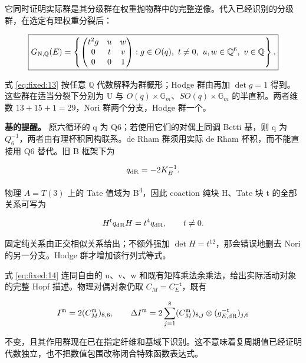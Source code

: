\documentclass[11pt,a4paper,oneside]{ctexart}
\theoremstyle{cnplain}
\theoremstyle{definition}
\theoremstyle{remark}
\numberwithin{equation}{section}
\begin{document}
它同时证明实际群是其分级群在权重抛物群中的完整逆像。代入已经识别的分级群，在选定有理权重分裂后：

\begin{equation}
\boxed{
 G_{\rm N,\mathbb Q}(E)=
 \left\{\begin{pmatrix}t^2g&u&w\\0&t&v\\0&0&1\end{pmatrix}:
     g\in O(q),\ t\ne0,\ u,w\in\mathbb Q^6,\ v\in\mathbb Q\right\}.
 }                                                               \label{eq:fixed:13}
\end{equation}

式 \eqref{eq:fixed:13} 按任意 \(\mathbb Q\) 代数解释为群概形；Hodge 群由再加 \(\det g=1\) 得到。这些群在适当分裂下分别为 U 与 \(O(q)\times\mathbb G_m\)、\(SO(q)\times\mathbb G_m\) 的半直积。两者维数 \(13+15+1=29\)，Nori 群两个分支，Hodge 群一个。

\textbf{基的提醒。} 原六循环的 q 为 Q6；若使用它们的对偶上同调 Betti 基，则 q 为 \(Q_6^{-1}\)，两者由有理杯积同构联系。de Rham 群须用实际 de Rham 杯积，而不能直接用 Q6 替代。旧 B 框架下为

\begin{equation}
q_{\rm dR}=-2K_B^{-1}.
\end{equation}

物理 \(A=T(3)\) 上的 Tate 值域为 B\textsuperscript{4}，因此 coaction 纯块 H、Tate 块 t 的全部关系可写为

\begin{equation}
H^{\mathsf t}q_{\rm dR}H=t^4q_{\rm dR},
                  \qquad t\ne0.                                \label{eq:fixed:14}
\end{equation}

固定纯关系由正交相似关系给出；不额外强加 \(\det H=t^{12}\)，那会错误地删去 Nori 的另一分支。Hodge 群才增加该行列式等式。

式 \eqref{eq:fixed:14} 连同自由的 u、v、w 和既有矩阵乘法余乘法，给出实际活动对象的完整 Hopf 描述。物理对偶对象仍取 \(C_M=C_E^{-\mathsf t}\)，既有

\begin{equation}
I^{\mathfrak m}=2(C_M^{\mathfrak m})_{8,6},\qquad
 \Delta I^{\mathfrak m}
 =2\sum_{j=1}^8(C_M^{\mathfrak m})_{8,j}
       \otimes(g_{E,\rm dR}^{-\mathsf t})_{j,6}
\end{equation}

不变，且其作用群现在已在指定纤维和基域下识别。这不意味着复周期值已经证明代数独立，也不把数值包围改称闭合特殊函数表达式。
\end{document}
